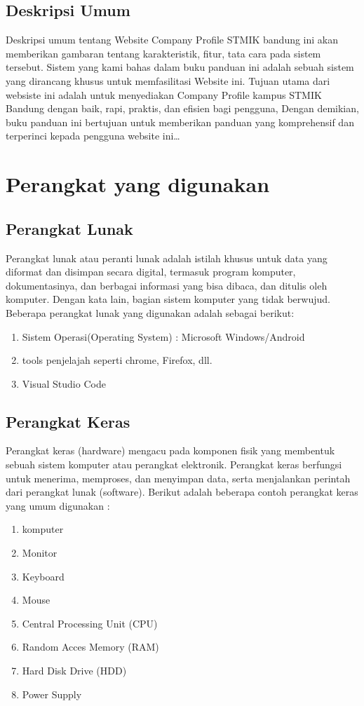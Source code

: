 \documentclass[a4paper,12 pt]{article}
\begin{document}
\subsection{Deskripsi Umum}
Deskripsi umum tentang Website Company Profile STMIK bandung  ini akan memberikan gambaran tentang karakteristik, fitur, tata cara pada sistem tersebut. Sistem yang kami bahas dalam buku panduan ini adalah sebuah sistem yang dirancang khusus untuk memfasilitasi Website ini. Tujuan utama dari websiste ini adalah untuk menyediakan Company Profile kampus STMIK Bandung dengan baik, rapi, praktis, dan efisien bagi pengguna, 
Dengan demikian, buku panduan ini bertujuan untuk memberikan panduan yang komprehensif dan terperinci kepada pengguna website ini\dots

\section{Perangkat yang digunakan}
\subsection{Perangkat Lunak}
Perangkat lunak atau peranti lunak adalah istilah khusus untuk data yang diformat 
dan disimpan secara digital, termasuk program komputer, dokumentasinya, dan berbagai informasi yang bisa dibaca, dan ditulis oleh komputer. Dengan kata lain, bagian sistem komputer yang tidak berwujud. 
Beberapa perangkat lunak yang digunakan adalah sebagai berikut:
\begin{enumerate}
  \item Sistem Operasi(Operating System) : Microsoft Windows/Android 
  \item tools penjelajah seperti chrome, Firefox, dll.
  \item Visual Studio Code
\end{enumerate}

\subsection{Perangkat Keras}
Perangkat keras (hardware) mengacu pada komponen fisik yang membentuk sebuah sistem komputer atau perangkat elektronik. Perangkat keras berfungsi untuk menerima, memproses, dan menyimpan data, serta menjalankan perintah dari perangkat lunak (software). 
Berikut adalah beberapa contoh perangkat keras yang umum digunakan :
\begin{enumerate}
  \item komputer
  \item Monitor
  \item Keyboard
  \item Mouse
  \item Central Processing Unit (CPU)
  \item Random Acces Memory (RAM)
  \item Hard Disk Drive (HDD)
  \item Power Supply
\end{enumerate}
\end{document}
